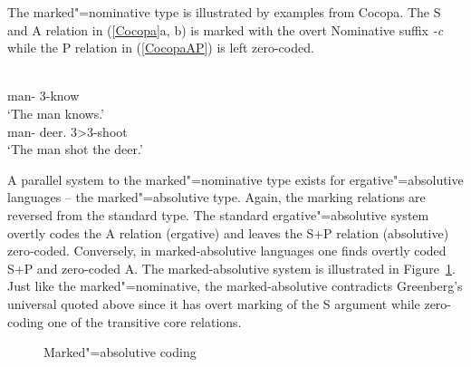 The marked"=nominative type is illustrated by examples from Cocopa. 
The S and A relation in (\ref{Cocopa}a, b) is marked with the overt Nominative suffix \emph{-c} while the P relation in (\ref{CocopaAP}) is left zero-coded.

\begin{exe}\ex\label{Cocopa}
\begin{xlist}
\ex\label{CocopaS}\gll{} \\
man-{\nom{}} 3-know\\
`The man knows.'
\ex\label{CocopaAP}\gll {}  \\
man-{\nom{}} deer.{\acc{}} 3>3-shoot\\
`The man shot the deer.'
\end{xlist}
\end{exe} 

A parallel system to the marked"=nominative type exists for ergative"=absolutive languages -- the marked"=absolutive type. 
Again, the marking relations are reversed from the standard type. 
The standard ergative"=absolutive system overtly codes the A relation (ergative) and leaves the S+P relation (absolutive) zero-coded. 
Conversely, in marked-absolutive languages one finds overtly coded S+P and zero-coded A. The marked-absolutive system is illustrated in Figure~\ref{MA-align}. 
Just like the marked"=nominative, the marked-absolutive contradicts Greenberg's universal quoted above since it has overt marking of the S argument while zero-coding one of the transitive core relations. 

\begin{figure}[h]
\begin{center}
\caption{Marked"=absolutive coding}\label{MA-align}
\end{center}
\end{figure}

